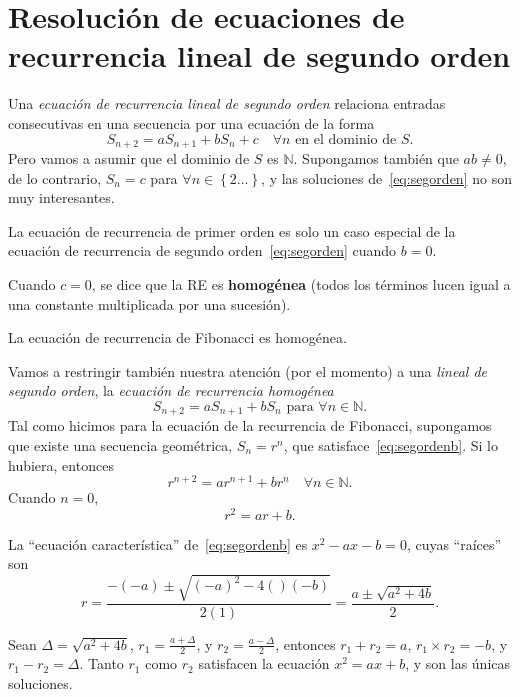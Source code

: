 \section{Resolución de ecuaciones de recurrencia lineal de segundo orden}

Una \emph{ecuación de recurrencia lineal de segundo orden} relaciona entradas consecutivas en una secuencia por una ecuación de la forma
\begin{equation}\label{eq:segordena}
	S_{n+2}=aS_{n+1}+bS_{n}+c\quad\forall n\text{ en el dominio de }S.
\end{equation}
Pero vamos a asumir que el dominio de $S$ es $\mathds{N}$. Supongamos también que $ab\neq0$, de lo contrario, $S_{n}=c$ para $\forall n\in\left\{2\ldots\right\}$, y las soluciones de~\eqref{eq:segorden} no son muy interesantes.

\begin{remark}
	La ecuación de recurrencia de primer orden es solo un caso especial de la ecuación de recurrencia de segundo orden~\eqref{eq:segorden} cuando $b=0$.
\end{remark}

Cuando $c=0$, se dice que la RE es \textbf{homogénea} (todos los términos lucen igual a una constante multiplicada por una sucesión).

\begin{remark}
	La ecuación de recurrencia de Fibonacci es homogénea.
\end{remark}

Vamos a restringir también nuestra atención (por el momento) a una \emph{lineal de segundo orden}, la \emph{ecuación de recurrencia homogénea}
\begin{equation}\label{eq:segordenb}
	S_{n+2}=aS_{n+1}+bS_{n}\text{ para }\forall n\in\mathds{N}.
\end{equation}
Tal como hicimos para la ecuación de la recurrencia de Fibonacci, supongamos que existe una secuencia geométrica, $S_{n}=r^{n}$, que satisface~\eqref{eq:segordenb}. Si lo hubiera, entonces \[ r^{n+2}=ar^{n+1}+br^{n}\quad\forall n\in\mathds{N}. \] Cuando $n=0$, \[ r^{2}=ar+b. \]

La ``ecuación característica'' de~\eqref{eq:segordenb} es $x^2-ax-b=0$, cuyas ``raíces'' son \[ r=\frac{-\left(-a\right)\pm\sqrt{{\left(-a\right)}^{2}-4\left(\right)\left(-b\right)}}{2\left(1\right)}=\frac{a\pm\sqrt{a^{2}+4b}}{2}. \]

Sean $\Delta=\sqrt{a^2+4b}$, $r_1=\frac{a+\Delta}{2}$, y $r_2=\frac{a-\Delta}{2}$, entonces $r_{1}+r_{2}=a$, $r_{1}\times r_{2}=-b$, y $r_{1}-r_{2}=\Delta$. Tanto $r_{1}$ como $r_{2}$ satisfacen la ecuación $x^{2}=ax+b$, y son las únicas soluciones.

